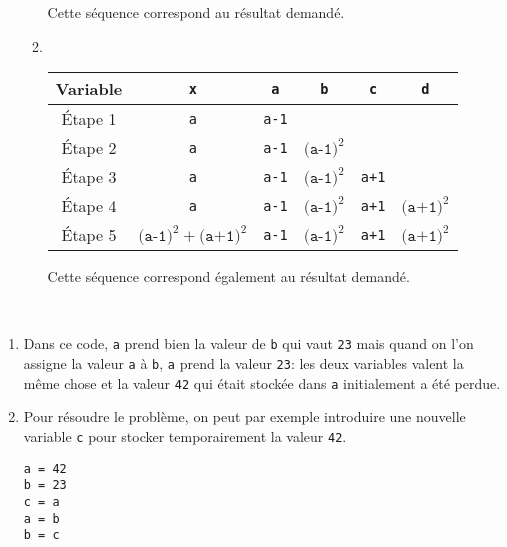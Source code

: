 \begin{correction}
\begin{enumerate}
\begin{enumerate}
	
		Cette séquence correspond au résultat demandé.
		\item~\begin{center}
			\begin{tabular}{|c|c|c|c|c|c|}
				\hline
				Variable &\texttt{x}&\texttt{a}&\texttt{b}&\texttt{c}&\texttt{d} \\\hline
				Étape 1 &\texttt{a}&\texttt{a-1}&&&\\\hline
				Étape 2 &\texttt{a}&\texttt{a-1}&$\texttt{(a-1)}^2$&&\\\hline
				Étape 3 &\texttt{a}&\texttt{a-1}&$\texttt{(a-1)}^2$&\texttt{a+1}&\\\hline
				Étape 4 &\texttt{a}&\texttt{a-1}&$\texttt{(a-1)}^2$&\texttt{a+1}&$\texttt{(a+1)}^2$\\\hline
				Étape 5 &$\texttt{(a-1)}^2+\texttt{(a+1)}^2$&\texttt{a-1}&$\texttt{(a-1)}^2$&\texttt{a+1}&$\texttt{(a+1)}^2$\\\hline
			\end{tabular}\end{center}
		
		Cette séquence correspond également au résultat demandé.
	\end{enumerate}
	\end{enumerate}
\end{correction}

\begin{correction}~
	\begin{enumerate}
		\item Dans ce code, \texttt{a} prend bien la valeur de \texttt{b} qui vaut \texttt{23} mais quand on l'on assigne la valeur \texttt{a} à \texttt{b}, \texttt{a} prend la valeur \texttt{23}: les deux variables valent la même chose et la valeur \texttt{42} qui était stockée dans \texttt{a} initialement a été perdue.
		\item Pour résoudre le problème, on peut par exemple introduire une nouvelle variable \texttt{c} pour stocker temporairement la valeur \texttt{42}.
		\begin{center}
			\begin{varwidth}[t]{\textwidth}
				\begin{lstlisting}[language=iPython,linewidth = 3cm]
a = 42
b = 23
c = a
a = b
b = c
\end{lstlisting}
			\end{varwidth}
		\end{center}
	\end{enumerate}
\end{correction}
 

